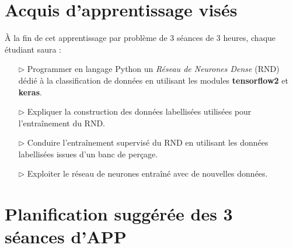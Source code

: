 \documentclass[11pt,french]{article}
\begin{document}

\renewcommand{\ttdefault}[0]{lmtt}
\newcommand{\boldtt}[1]{{\ttfamily\bfseries #1}}

\newcommand{\QtLogo}[0]{\texttt{[image: Images/QtLogo.projet]}}
\newcommand{\PyQt}[0]{\boldtt{PyQt5}}
\newcommand{\Qt}[0]{\boldtt{Qt}}

\begin{center}
\setlength{\fboxsep}{5mm}
\setlength{\fboxrule}{0.2mm}

\medskip
{}
\end{center}

\section*{Acquis d'apprentissage visés}

À la fin de cet apprentissage par problème de 3 séances de 3 heures, chaque étudiant saura :
\begin{itemize}
\item[$\rhd$] Programmer en langage Python un {\em Réseau de Neurones Dense} (RND) dédié à la classification de données
  en utilisant les modules \boldtt{tensorflow2} et \boldtt{keras}.
\item[$\rhd$] Expliquer la construction des données labellisées utilisées pour l'entraînement du RND.
\item[$\rhd$] Conduire l'entraînement supervisé du RND en utilisant les données labellisées issues d'un banc de perçage.
\item[$\rhd$] Exploiter le réseau de neurones entraîné avec de nouvelles données.
\end{itemize}

\newpage
\vspace*{-16mm}
\section*{\Large{} Planification suggérée des 3 séances d'APP}
\end{document}
